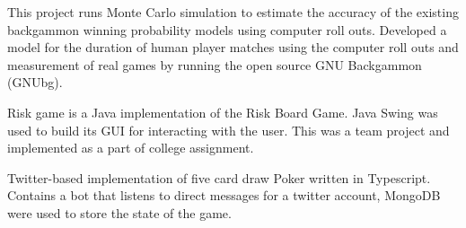 \documentclass[]{ben-resume-openfont}
\begin{document}
\begin{minipage}[t]{0.37\textwidth}
This project runs Monte Carlo simulation to estimate the accuracy of the existing backgammon winning probability models using computer roll outs. Developed a model for the duration of human player matches using the computer roll outs and measurement of real games by running the open source GNU Backgammon (GNUbg).
\sectionsep

Risk game is a Java implementation of the Risk Board Game. Java Swing was used to build its GUI for interacting with the user. This was a team project and implemented as a part of college assignment.
\sectionsep

Twitter-based implementation of five card draw Poker written in Typescript. Contains a bot that listens to direct messages for a twitter account, MongoDB were used to store the state of the game.
\sectionsep


%
%

\end{minipage} 
\hfill
\end{document}
